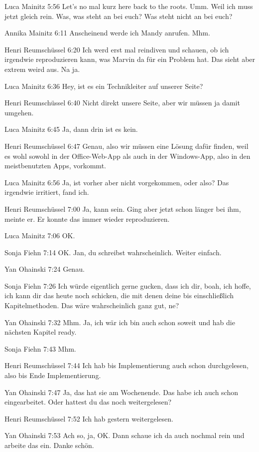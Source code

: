 Luca Mainitz   5:56
Let's no mal kurz here back to the roots.
Umm.
Weil ich muss jetzt gleich rein. Was, was steht an bei euch? Was steht nicht an bei euch?

Annika Mainitz   6:11
Anscheinend werde ich Mandy anrufen.
Mhm.

Henri Reumschüssel   6:20
Ich werd erst mal reindiven und schauen, ob ich irgendwie reproduzieren kann, was Marvin da für ein Problem hat.
Das sieht aber extrem weird aus.
Na ja.

Luca Mainitz   6:36
Hey, ist es ein Technikleiter auf unserer Seite?

Henri Reumschüssel   6:40
Nicht direkt unsere Seite, aber wir müssen ja damit umgehen.

Luca Mainitz   6:45
Ja, dann drin ist es kein.

Henri Reumschüssel   6:47
Genau, also wir müssen eine Lösung dafür finden, weil es wohl sowohl in der Office-Web-App als auch in der Windows-App, also in den meistbenutzten Apps, vorkommt.

Luca Mainitz   6:56
Ja, ist vorher aber nicht vorgekommen, oder also?
Das irgendwie irritiert, fand ich.

Henri Reumschüssel   7:00
Ja, kann sein. Ging aber jetzt schon länger bei ihm, meinte er. Er konnte das immer wieder reproduzieren.

Luca Mainitz   7:06
OK.

Sonja Fiehn   7:14
OK.
Jan, du schreibst wahrscheinlich.
Weiter einfach.

Yan Ohainski   7:24
Genau.

Sonja Fiehn   7:26
Ich würde eigentlich gerne gucken, dass ich dir, boah, ich hoffe, ich kann dir das heute noch schicken, die mit denen deine bis einschließlich Kapitelmethoden. Das wäre wahrscheinlich ganz gut, ne?

Yan Ohainski   7:32
Mhm.
Ja, ich wär ich bin auch schon soweit und hab die nächsten Kapitel ready.

Sonja Fiehn   7:43
Mhm.

Henri Reumschüssel   7:44
Ich hab bis Implementierung auch schon durchgelesen, also bis Ende Implementierung.

Yan Ohainski   7:47
Ja, das hat sie am Wochenende. Das habe ich auch schon eingearbeitet. Oder hattest du das noch weitergelesen?

Henri Reumschüssel   7:52
Ich hab gestern weitergelesen.

Yan Ohainski   7:53
Ach so, ja, OK. Dann schaue ich da auch nochmal rein und arbeite das ein. Danke schön.

